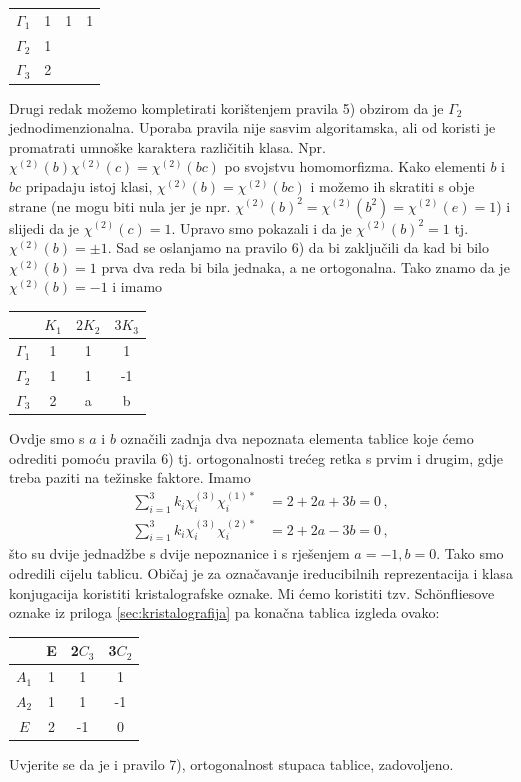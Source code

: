 \begin{primjer}
\begin{center}
\begin{tabular}{c|ccc}
$\Gamma_1$ & 1 & 1 & 1   \\
$\Gamma_2$ & 1 &  &   \\
 $\Gamma_3$  & 2 &  &  
\end{tabular}
\end{center}
Drugi redak možemo kompletirati korištenjem pravila 5) obzirom da je $\Gamma_2$
jednodimenzionalna. Uporaba pravila nije sasvim algoritamska, ali od koristi je promatrati
umnoške karaktera različitih klasa. Npr. $\chi^{(2)}(b)\chi^{(2)}(c)=\chi^{(2)}(bc)$
po svojstvu homomorfizma. Kako elementi $b$ i $bc$ pripadaju istoj klasi,
$\chi^{(2)}(b)=\chi^{(2)}(bc)$
i možemo ih skratiti s obje strane (ne mogu biti nula jer je npr. 
$\chi^{(2)}(b)^2 = \chi^{(2)}(b^2) =
\chi^{(2)}(e) = 1$) i slijedi da je $\chi^{(2)}(c)=1$. Upravo smo pokazali i da je 
  $\chi^{(2)}(b)^2=1$ tj. $\chi^{(2)}(b)=\pm 1$.
Sad se oslanjamo na pravilo 6) da bi zaključili da kad bi bilo 
$\chi^{(2)}(b)=1$ prva dva reda bi bila jednaka, a ne
ortogonalna. Tako znamo da je $ \chi^{(2)}(b)=-1$ i imamo
\begin{center}
\begin{tabular}{c|ccc}
  & $K_1$ & $2 K_2$  & $ 3 K_3$ \\ \hline
$\Gamma_1$ & 1 & 1 & 1   \\
$\Gamma_2$ & 1 & 1 & -1   \\
 $\Gamma_3$  & 2 & a  & b  
\end{tabular}
\end{center}
Ovdje smo s $a$ i $b$ označili zadnja dva nepoznata elementa tablice koje ćemo
odrediti pomoću pravila 6) tj. ortogonalnosti trećeg retka s prvim i drugim,
gdje treba paziti na težinske faktore. Imamo
\begin{align*}
    \sum_{i=1}^{3} k_{i} \chi^{(3)}_{i} \chi^{(1) *}_{i}& =
      2+2a+3b=0 \,, \\
    \sum_{i=1}^{3} k_{i} \chi^{(3)}_{i} \chi^{(2) *}_{i}& =
      2+2a-3b=0  \,,
\end{align*}
što su dvije jednadžbe s dvije nepoznanice i s rješenjem $a=-1, b=0$.
Tako smo odredili cijelu tablicu. Običaj je za označavanje ireducibilnih
reprezentacija i klasa konjugacija koristiti kristalografske
oznake. Mi ćemo koristiti tzv. Sch\"{o}nfliesove oznake iz priloga \ref{sec:kristalografija} 
pa konačna tablica izgleda ovako:
\begin{center}
\begin{tabular}{c|ccc}
  & E & 2$C_3$  & 3$C_2$ \\ \hline
$A_1$ & 1 & 1& 1 \\
$A_2$ & 1 & 1&-1 \\
 $E$  & 2 &-1& 0
\end{tabular}
\end{center}
Uvjerite se da je i pravilo 7), ortogonalnost stupaca tablice, zadovoljeno.
\end{primjer}

